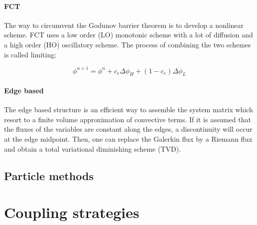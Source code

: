 \paragraph*{FCT} The way to circumvent the Godunov barrier theorem \cite{godunov1959} is to develop a nonlinear scheme. FCT uses a low order (LO) monotonic scheme with a lot of diffusion and a high order (HO) oscillatory scheme. The process of combining the two schemes is called limiting:

\begin{equation}
\phi^{n+1} = \phi^n + c_e\Delta \phi_H + (1-c_e)\Delta \phi_L
\end{equation}

\paragraph*{Edge based} The edge based structure is an efficient way to assemble the system matrix which resort to a
finite volume approximation of convective terms. If it is assumed that the fluxes of the variables are constant along the edges, a discontinuity will occur at the edge midpoint. Then, one can replace the Galerkin flux by a Riemann flux and obtain a total variational diminishing scheme (TVD).


\subsection{Particle methods}



\section{Coupling strategies}


